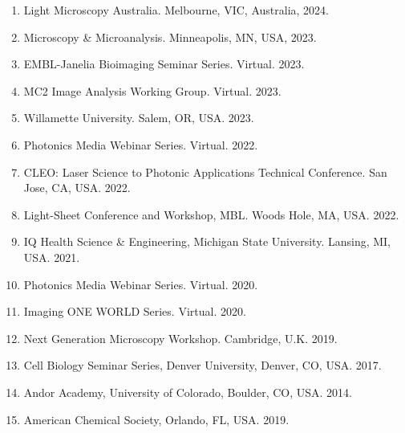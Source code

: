 \begin{enumerate}
\item Light Microscopy Australia. Melbourne, VIC, Australia, 2024.
\item Microscopy \& Microanalysis. Minneapolis, MN, USA, 2023.
\item EMBL-Janelia Bioimaging Seminar Series. Virtual. 2023.
\item MC2 Image Analysis Working Group. Virtual. 2023.
\item Willamette University.  Salem, OR, USA. 2023.
\item Photonics Media Webinar Series.   Virtual. 2022.
\item CLEO: Laser Science to Photonic Applications Technical Conference. San Jose, CA, USA. 2022.
\item Light-Sheet Conference and Workshop, MBL.  Woods Hole, MA, USA. 2022.
\item IQ Health Science \& Engineering, Michigan State University. Lansing, MI, USA. 2021.
\item Photonics Media Webinar Series.  Virtual. 2020.
\item Imaging ONE WORLD Series. Virtual. 2020.
\item Next Generation Microscopy Workshop.  Cambridge, U.K. 2019.
\item Cell Biology Seminar Series, Denver University, Denver, CO, USA. 2017.
\item Andor Academy, University of Colorado, Boulder, CO, USA. 2014.
\item American Chemical Society, Orlando, FL, USA. 2019.
\end{enumerate}
